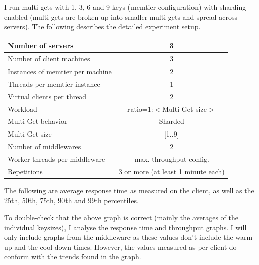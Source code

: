 \documentclass[11pt,a4paper]{article}
\begin{document}
I run multi-gets with 1, 3, 6 and 9 keys (memtier configuration) with sharding enabled (multi-gets are broken up into smaller multi-gets and spread across servers). 
The following describes the detailed experiment setup.

\begin{center}
	\scriptsize{
		\begin{tabular}{|l|c|}
			\hline Number of servers                & 3                       \\ 
			\hline Number of client machines        & 3                       \\ 
			\hline Instances of memtier per machine & 2                       \\ 
			\hline Threads per memtier instance     & 1                       \\
			\hline Virtual clients per thread       & 2     		            \\ 
			\hline Workload                         & ratio=1:$<$Multi-Get size$>$             \\
			\hline Multi-Get behavior               & Sharded                 \\
			\hline Multi-Get size                   & [1..9]                  \\
			\hline Number of middlewares            & 2                       \\
			\hline Worker threads per middleware    & max. throughput config. \\
			\hline Repetitions                      & 3 or more (at least 1 minute each)               \\ 
			\hline 
		\end{tabular}
	} 
\end{center}

The following are average response time as measured on the client, as well as the 25th, 50th, 75th, 90th and 99th percentiles.

To double-check that the above graph is correct (mainly the averages of the individual keysizes), I analyse the response time and throughput graphs.
I will only include graphs from the middleware as these values don't include the warm-up and the cool-down times.
However, the values measured as per client do conform with the trends found in the graph. 
\end{document}

